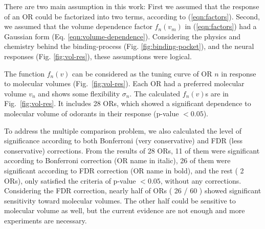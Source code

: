 \documentclass[11pt]{paper} %
\newcommand{\numberofreceptors}{ 28 }
\newcommand{\bonferroni}{ 11 }
\newcommand{\fdr}{ 26 }
\newcommand{\nocorrection}{ 2 }
\begin{document}
There are two main assumption in this work: 
First we assumed that the response of an OR could be factorized into two terms, 
according to (\ref{eqn:factors}).
Second, we assumed that the volume dependence factor $f_n(v_m)$ in (\ref{eqn:factors}) 
had a Gaussian form (Eq. \ref{eqn:volume-dependence}).
Considering the physics and chemistry behind the binding-process (Fig. \ref{fig:binding-pocket}), 
and the neural responses (Fig. \ref{fig:vol-res}), 
these assumptions were logical. 


The function $f_n(v)$ can be considered as the tuning curve of OR $n$ in response to molecular volumes (Fig.~\ref{fig:vol-res}). 
Each OR had a preferred molecular volume $v_n$ and shows some flexibility $\sigma_n$. 
The calculated $f_n(v)$s are in  Fig.~\ref{fig:vol-res}. 
It includes \numberofreceptors ORs, 
which showed a significant dependence to molecular volume of odorants in their response (p-value $<0.05$).

To address the multiple comparison problem, 
we also calculated the level of significance according to both Bonferroni (very conservative) and FDR (less conservative) corrections. 
From the results of \numberofreceptors ORs, 
\bonferroni of them were significant according to Bonferroni correction (OR name in italic), 
\fdr of them were significant according to FDR correction 
(OR name in bold), 
and the rest (\nocorrection ORs), 
only satisfied the criteria of p-value $<0.05$, without any corrections.
Considering the FDR correction, 
nearly half of ORs (\fdr / 60 ) showed significant sensitivity toward molecular volumes. 
The other half could be sensitive to molecular volume as well, 
but the current evidence are not enough and more experiments are necessary. 
\end{document}
